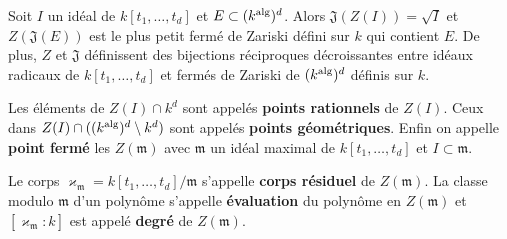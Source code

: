 	\begin{pop}
		Soit $I$ un idéal de $k[t_1,\ldots,t_d]$ et $E \subset (k^{\operatorname{alg}})^d$.
		Alors $\mathfrak{J}(Z(I)) = \surd I$ et $Z(\mathfrak{J}(E))$ est le plus petit fermé de Zariski défini sur $k$ qui contient $E$.
		De plus, $Z$ et $\mathfrak{J}$ définissent des bijections réciproques décroissantes entre idéaux radicaux de $k[t_1,\ldots,t_d]$ et fermés de Zariski de $(k^{\operatorname{alg}})^d$ définis sur $k$.
	\end{pop}
	
	\begin{defn}
		Les éléments de $Z(I) \cap k^d$ sont appelés \textbf{points rationnels} de $Z(I)$.
		Ceux dans $Z(I) \cap ((k^{\operatorname{alg}})^d \setminus k^d)$ sont appelés \textbf{points géométriques}.
		Enfin on appelle \textbf{point fermé} les $Z(\mathfrak{m})$ avec $\mathfrak{m}$ un idéal maximal de $k[t_1,\ldots,t_d]$ et $I \subset \mathfrak{m}$.
	\end{defn}
	
	\begin{defn}
		Le corps $\varkappa_{\mathfrak{m}} = k[t_1,\ldots,t_d] / \mathfrak{m}$ s'appelle \textbf{corps résiduel} de $Z(\mathfrak{m})$.
		La classe modulo $\mathfrak{m}$ d'un polynôme s'appelle \textbf{évaluation} du polynôme en $Z(\mathfrak{m})$ et $[\varkappa_{\mathfrak{m}} : k]$ est appelé \textbf{degré} de $Z(\mathfrak{m})$.
	\end{defn}